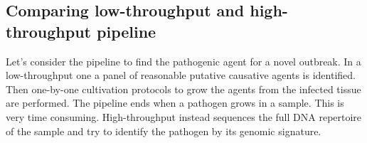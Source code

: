 	\subsection{Comparing low-throughput and high-throughput pipeline}
	Let's consider the pipeline to find the pathogenic agent for a novel outbreak.
	In a low-throughput one a panel of reasonable putative causative agents is identified.
	Then one-by-one cultivation protocols to grow the agents from the infected tissue are performed.
	The pipeline ends when a pathogen grows in a sample.
	This is very time consuming.
	High-throughput instead sequences the full DNA repertoire of the sample and try to identify the pathogen by its genomic signature.

